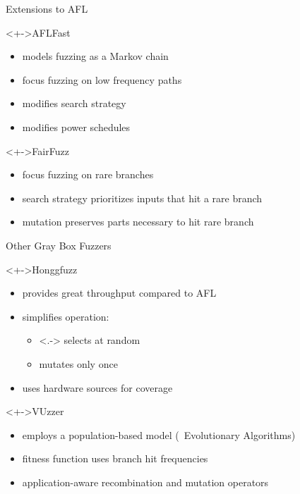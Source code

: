 \documentclass[handout]{beamer}
\begin{document}
\begin{frame}{Extensions to AFL}
    \begin{block}<+->{AFLFast}
        \begin{itemize}[<+->]
            \item{} models fuzzing as a Markov chain
            \item{} focus fuzzing on low frequency paths
            \item{} modifies search strategy
            \item{} modifies power schedules
        \end{itemize}
    \end{block}
    \begin{block}<+->{FairFuzz}
        \begin{itemize}[<+->]
            \item{} focus fuzzing on rare branches
            \item{} search strategy prioritizes inputs that hit a rare branch
            \item{} mutation preserves parts necessary to hit rare branch
        \end{itemize}
    \end{block}
\end{frame}

\begin{frame}{Other Gray Box Fuzzers}
    \begin{block}<+->{Honggfuzz}
        \begin{itemize}[<+->]
            \item{} provides great throughput compared to AFL
            \item{} simplifies operation:
                \begin{itemize}
                    \item<.-> selects at random
                    \item{} mutates only once
                \end{itemize}
            \item{} uses hardware sources for coverage
        \end{itemize}
    \end{block}
    \begin{block}<+->{VUzzer}
        \begin{itemize}[<+->]
            \item{} employs a population-based model (\ie~Evolutionary Algorithms)
            \item{} fitness function uses branch hit frequencies
            \item{} application-aware recombination and mutation operators
        \end{itemize}
    \end{block}
\end{frame}
\end{document}
